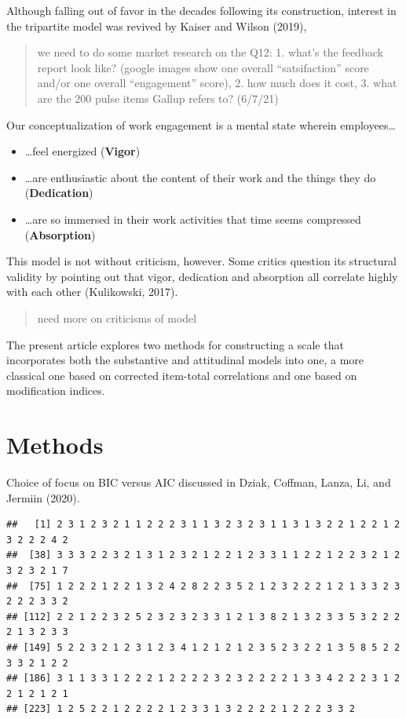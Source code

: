 \documentclass[
  english,
  man]{apa6}
\providecommand{\tightlist}{%
  \setlength{\itemsep}{0pt}\setlength{\parskip}{0pt}}
\begin{document}
Although falling out of favor in the decades following its construction, interest in the tripartite model was revived by Kaiser and Wilson (2019),

\begin{quote}
we need to do some market research on the Q12: 1. what's the feedback report look like? (google images show one overall ``satsifaction'' score and/or one overall ``engagement'' score), 2. how much does it cost, 3. what are the 200 pulse items Gallup refers to? (6/7/21)
\end{quote}

Our conceptualization of work engagement is a mental state wherein employees\ldots{}

\begin{itemize}
\tightlist
\item
  \ldots feel energized (\textbf{Vigor})
\item
  \ldots are enthusiastic about the content of their work and the things they do (\textbf{Dedication})
\item
  \ldots are so immersed in their work activities that time seems compressed (\textbf{Absorption})
\end{itemize}

This model is not without criticism, however. Some critics question its structural validity by pointing out that vigor, dedication and absorption all correlate highly with each other (Kulikowski, 2017).

\begin{quote}
need more on criticisms of model
\end{quote}

The present article explores two methods for constructing a scale that incorporates both the substantive and attitudinal models into one, a more classical one based on corrected item-total correlations and one based on modification indices.

\hypertarget{methods}{%
\section{Methods}\label{methods}}

Choice of focus on BIC versus AIC discussed in Dziak, Coffman, Lanza, Li, and Jermiin (2020).

\begin{verbatim}
##   [1] 2 3 1 2 3 2 1 1 2 2 2 3 1 1 3 2 3 2 3 1 1 3 1 3 2 2 1 2 2 1 2 3 2 2 2 4 2
##  [38] 3 3 3 2 2 3 2 1 3 1 2 3 2 1 2 2 1 2 3 3 1 1 2 2 1 2 2 3 2 1 2 3 2 3 2 1 7
##  [75] 1 2 2 2 1 2 2 1 3 2 4 2 8 2 2 3 5 2 1 2 3 2 2 2 1 2 1 3 3 2 3 2 2 2 3 3 2
## [112] 2 2 1 2 2 3 2 5 2 3 2 3 2 3 3 1 2 1 3 8 2 1 3 2 3 3 5 3 2 2 2 2 1 3 2 3 3
## [149] 5 2 2 3 2 1 2 3 1 2 3 4 1 2 1 2 1 2 3 5 2 3 2 2 1 3 5 8 5 2 2 3 3 2 1 2 2
## [186] 3 1 1 3 3 1 2 2 2 1 2 2 2 2 3 2 3 2 2 2 2 1 3 3 4 2 2 2 3 1 2 2 1 2 1 2 1
## [223] 1 2 5 2 2 1 2 2 2 2 1 2 3 3 1 3 2 2 2 2 1 2 2 2 3 3 2
\end{verbatim}
\end{document}
